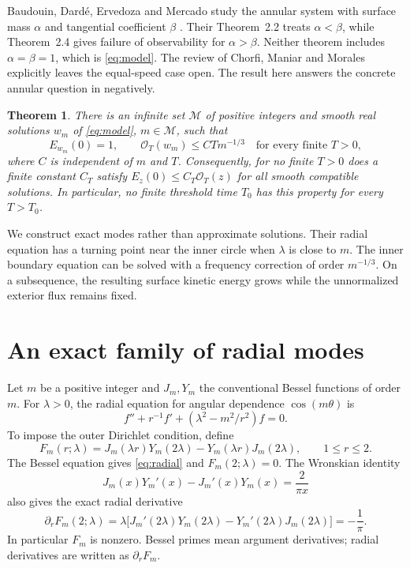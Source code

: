 \documentclass[11pt]{article}
\newtheorem{theorem}{Theorem}
\begin{document}
Baudouin, Dard\'e, Ervedoza and Mercado study the annular system with
surface mass \(\alpha\) and tangential coefficient \(\beta\)
\cite[Eq.~(1.3), pp.~60--61]{BDEM}. Their Theorem~2.2 treats
\(\alpha<\beta\), while Theorem~2.4 gives failure of observability for
\(\alpha>\beta\). Neither theorem includes \(\alpha=\beta=1\), which is
\eqref{eq:model}. The review of Chorfi, Maniar and Morales
\cite[Sec.~5.1]{CMM} explicitly leaves the equal-speed case open.
The result here answers the concrete annular question in
\cite{AIM385} negatively.

\begin{theorem}\label{thm:main}
There is an infinite set \(\mathcal M\) of positive integers and smooth real
solutions \(w_m\) of \eqref{eq:model}, \(m\in\mathcal M\), such that
\[
E_{w_m}(0)=1,\qquad
\mathcal O_T(w_m)\le C T m^{-1/3}
\quad\text{for every finite }T>0,
\]
where \(C\) is independent of \(m\) and \(T\).
Consequently, for no finite \(T>0\) does a finite constant \(C_T\) satisfy
\(E_z(0)\le C_T\mathcal O_T(z)\) for all smooth compatible solutions.
In particular, no finite threshold time \(T_0\) has this property for every
\(T>T_0\).
\end{theorem}

We construct exact modes rather than approximate solutions. Their radial
equation has a turning point near the inner circle when \(\lambda\) is close
to \(m\). The inner boundary equation can be solved with a frequency
correction of order \(m^{-1/3}\). On a subsequence, the resulting surface
kinetic energy grows while the unnormalized exterior flux remains fixed.

\section{An exact family of radial modes}

Let \(m\) be a positive integer and \(J_m,Y_m\) the conventional Bessel functions of order \(m\).
For \(\lambda>0\), the radial equation for angular dependence
\(\cos(m\theta)\) is
\begin{equation}\label{eq:radial}
f''+r^{-1}f'+(\lambda^2-m^2/r^2)f=0 .
\end{equation}
To impose the outer Dirichlet condition, define
\begin{equation}\label{eq:F}
F_m(r;\lambda)=J_m(\lambda r)Y_m(2\lambda)
-Y_m(\lambda r)J_m(2\lambda),\qquad 1\le r\le2 .
\end{equation}
The Bessel equation gives \eqref{eq:radial} and \(F_m(2;\lambda)=0\).
The Wronskian identity
\cite[Eq.~10.5.2]{DLMF}
\[
J_m(x)Y_m'(x)-J_m'(x)Y_m(x)=\frac{2}{\pi x}
\]
also gives the exact radial derivative
\begin{equation}\label{eq:flux}
\partial_rF_m(2;\lambda)
=\lambda\bigl[J_m'(2\lambda)Y_m(2\lambda)
-Y_m'(2\lambda)J_m(2\lambda)\bigr]=-\frac1\pi .
\end{equation}
In particular \(F_m\) is nonzero. Bessel primes mean argument derivatives;
radial derivatives are written as \(\partial_rF_m\).
\end{document}
